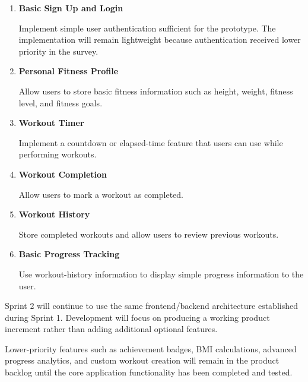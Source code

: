 \documentclass[11pt]{article}
\begin{document}
\begin{enumerate}

    \item \textbf{Basic Sign Up and Login}

    Implement simple user authentication sufficient for the prototype. The implementation will remain lightweight because authentication received lower priority in the survey.

    \item \textbf{Personal Fitness Profile}

    Allow users to store basic fitness information such as height, weight, fitness level, and fitness goals.

    \item \textbf{Workout Timer}

    Implement a countdown or elapsed-time feature that users can use while performing workouts.

    \item \textbf{Workout Completion}

    Allow users to mark a workout as completed.

    \item \textbf{Workout History}

    Store completed workouts and allow users to review previous workouts.

    \item \textbf{Basic Progress Tracking}

    Use workout-history information to display simple progress information to the user.

\end{enumerate}

Sprint 2 will continue to use the same frontend/backend architecture established during Sprint 1. Development will focus on producing a working product increment rather than adding additional optional features.

Lower-priority features such as achievement badges, BMI calculations, advanced progress analytics, and custom workout creation will remain in the product backlog until the core application functionality has been completed and tested.

\end{document}

